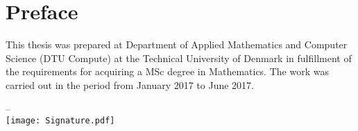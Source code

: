\chapter{Preface}
This thesis was prepared at Department of Applied Mathematics and Computer Science (DTU Compute) at the Technical University of Denmark in fulfillment of the requirements for acquiring a MSc degree in Mathematics. The work was carried out in the period from January 2017 to June 2017.

\vfill

{
\centering
    \thesislocation{} – \thesisdeadline{}\\[1cm]
    \hspace{3cm}\texttt{[image: Signature.pdf]}\\[1cm]
\begin{flushright}
    \thesisauthor{}
\end{flushright}
}
